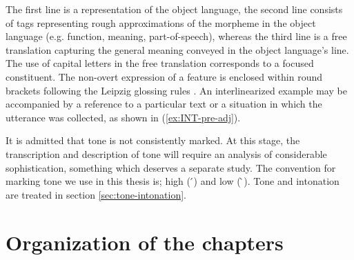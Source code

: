  The first line is a representation of the object language, the second line
consists of   tags representing  rough approximations   of the morpheme in the
object   language
 (e.g. function, meaning, part-of-speech), whereas the third line is a
free  translation capturing the general meaning  conveyed in the object
language's line.  The use of capital letters in the  free translation
corresponds to a focused constituent. The non-overt expression of a feature is
enclosed within round brackets following the Leipzig glossing rules
\citep{Comr08b}. An interlinearized example  may  be accompanied by a
reference  to a particular text or  a situation in which  the utterance was
collected, as shown in  (\ref{ex:INT-pre-adj}).

It is admitted that tone is not consistently marked. At this stage,  the
transcription and description of tone will require an analysis of
considerable sophistication, something which deserves a separate study. 
The convention for marking tone we use in this thesis is; high (  ́) and
low (  ̀). Tone and intonation are treated in section
\ref{sec:tone-intonation}.














\section{Organization of the chapters}
\label{sec:INT-organis-of-chap}


